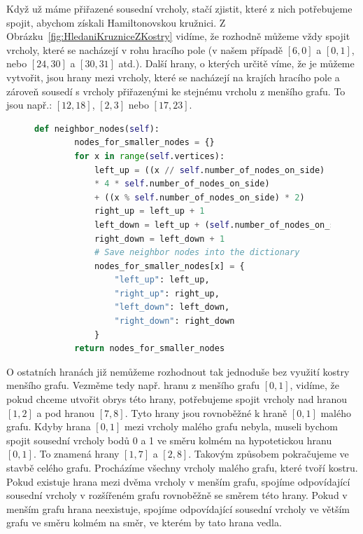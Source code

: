 Když už máme přiřazené sousední vrcholy, stačí zjistit, které z nich potřebujeme spojit, abychom získali Hamiltonovskou kružnici. Z Obrázku~\ref{fig:HledaniKruzniceZKostry} vidíme, že rozhodně můžeme vždy spojit vrcholy, které se nacházejí v rohu hracího pole (v našem případě $[6, 0]$ a $[0, 1]$, nebo $[24, 30]$ a $[30, 31]$ atd.). Další hrany, o kterých určitě víme, že je můžeme vytvořit, jsou hrany mezi vrcholy, které se nacházejí na krajích hracího pole a zároveň sousedí s vrcholy přiřazenými ke stejnému vrcholu z menšího grafu. To jsou např.: $[12, 18]$, $[2, 3]$ nebo $[17, 23]$.

\begin{figure}[H]
    \centering
    \begin{lstlisting}[language=python, style=python, caption={Určení sousedních vrcholů většího grafu}, label={lst:neighbor_nodes}, mathescape=true]
    def neighbor_nodes(self):
        nodes_for_smaller_nodes = {}
        for x in range(self.vertices):
            left_up = ((x // self.number_of_nodes_on_side) 
            * 4 * self.number_of_nodes_on_side)
            + ((x % self.number_of_nodes_on_side) * 2)
            right_up = left_up + 1
            left_down = left_up + (self.number_of_nodes_on_side * 2)
            right_down = left_down + 1
            # Save neighbor nodes into the dictionary
            nodes_for_smaller_nodes[x] = {
                "left_up": left_up,
                "right_up": right_up,
                "left_down": left_down,
                "right_down": right_down
            }
        return nodes_for_smaller_nodes
    \end{lstlisting}
\end{figure}

O ostatních hranách již nemůžeme rozhodnout tak jednoduše bez využití kostry menšího grafu. Vezměme tedy např. hranu z menšího grafu $[0, 1]$, vidíme, že pokud chceme utvořit obrys této hrany, potřebujeme spojit vrcholy nad hranou $[1, 2]$ a pod hranou $[7, 8]$. Tyto hrany jsou rovnoběžné k hraně $[0, 1]$ malého grafu. Kdyby hrana $[0, 1]$ mezi vrcholy malého grafu nebyla, museli bychom spojit sousední vrcholy bodů 0 a 1 ve směru kolmém na hypotetickou hranu $[0, 1]$. To znamená hrany $[1, 7]$ a $[2, 8]$. Takovým způsobem pokračujeme ve stavbě celého grafu. Procházíme všechny vrcholy malého grafu, které tvoří kostru. Pokud existuje hrana mezi dvěma vrcholy v menším grafu, spojíme odpovídající sousední vrcholy v rozšířeném grafu rovnoběžně se směrem této hrany. Pokud v menším grafu hrana neexistuje, spojíme odpovídající sousední vrcholy ve větším grafu ve směru kolmém na směr, ve kterém by tato hrana vedla.

